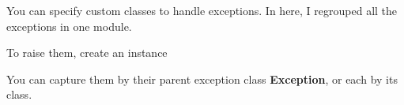 \documentclass{KodeBook}
\begin{document}
You can specify custom classes to handle exceptions. 
In here, I regrouped all the exceptions in one module.



To raise them, create an instance



You can capture them by their parent exception class \textbf{Exception}, or each by its class.






\ifx\wholebook\relax\else
% 
% 
	
\end{document}
